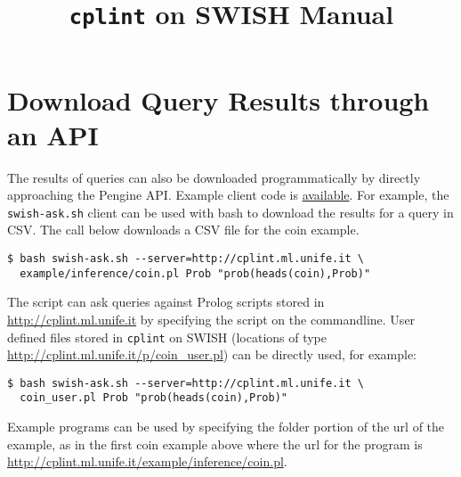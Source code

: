 \documentclass[a4paper,10pt]{scrartcl}
\begin{document}
\title{\texttt{cplint} on SWISH Manual}
\maketitle

%

















\section{Download Query Results through an API}
The results of queries can also be downloaded programmatically by directly
approaching the Pengine API. Example client code is 
\href{https://github.com/friguzzi/swish/tree/master/client}{available}.  For example, the \verb|swish-ask.sh| client
can be used with bash to download the results for a query in CSV.  The call
below downloads a CSV file for the coin example.
\begin{verbatim}
$ bash swish-ask.sh --server=http://cplint.ml.unife.it \   
  example/inference/coin.pl Prob "prob(heads(coin),Prob)"
\end{verbatim}
The script can ask queries against Prolog scripts stored in 
\url{http://cplint.ml.unife.it} by specifying
the script on the commandline.  User defined files stored
in \texttt{cplint} on SWISH (locations of type
\url{http://cplint.ml.unife.it/p/coin_user.pl}) can
be directly used, for example:
\begin{verbatim}
$ bash swish-ask.sh --server=http://cplint.ml.unife.it \
  coin_user.pl Prob "prob(heads(coin),Prob)"
\end{verbatim}
Example programs can be used by specifying the folder portion of the url of the example,
as in the first coin example above where the url for the program is 
\url{http://cplint.ml.unife.it/example/inference/coin.pl}.
\end{document}
